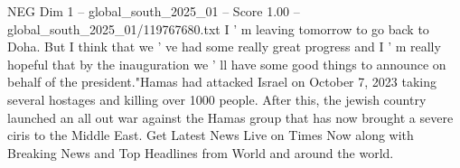 \begin{textsample}{NEG Dim 1 – global\_south\_2025\_01 – Score 1.00 – global\_south\_2025\_01/119767680.txt}
I ' m leaving tomorrow to go back to Doha.
But I think that we ' ve had some really great progress and I ' m really hopeful that by the inauguration we ' ll have some good things to announce on behalf of the president."Hamas had attacked Israel on October 7, 2023 taking several hostages and killing over 1000 people.
After this, the jewish country launched an all out war against the Hamas group that has now brought a severe ciris to the Middle East.
Get Latest News Live on Times Now along with Breaking News and Top Headlines from World and around the world.

\end{textsample}
